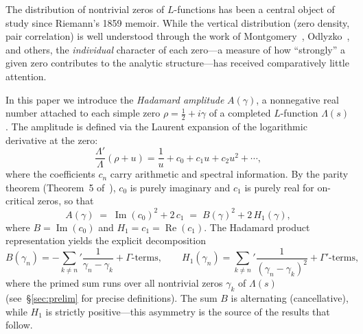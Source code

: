 \documentclass[11pt,a4paper]{article}
\theoremstyle{plain}
\theoremstyle{definition}
\newcommand{\La}{\Lambda}
\begin{document}
The distribution of nontrivial zeros of $L$-functions has been a central
object of study since Riemann's 1859 memoir.  While the vertical
distribution (zero density, pair correlation) is well understood
through the work of Montgomery~\cite{montgomery1973},
Odlyzko~\cite{odlyzko1987}, and others, the \emph{individual} character
of each zero---a measure of how ``strongly'' a given zero contributes
to the analytic structure---has received comparatively little attention.

In this paper we introduce the \emph{Hadamard amplitude}
$A(\gamma)$, a nonnegative real number attached to each simple zero
$\rho = \tfrac{1}{2} + i\gamma$ of a completed $L$-function
$\La(s)$.  The amplitude is defined via the Laurent expansion of
the logarithmic derivative at the zero:
\begin{equation}\label{eq:laurent}
  \frac{\La'}{\La}(\rho + u) = \frac{1}{u} + c_0 + c_1 u
  + c_2 u^2 + \cdots,
\end{equation}
where the coefficients $c_n$ carry arithmetic and spectral information.
By the parity theorem (Theorem~5 of~\cite{paper2}), $c_0$ is purely
imaginary and $c_1$ is purely real for on-critical zeros, so that
\begin{equation}\label{eq:amplitude_def}
  A(\gamma) \;=\; \operatorname{Im}(c_0)^2 + 2\,c_1
  \;=\; B(\gamma)^2 + 2\,H_1(\gamma),
\end{equation}
where $B = \operatorname{Im}(c_0)$ and $H_1 = c_1 = \operatorname{Re}(c_1)$.
The Hadamard product representation yields the explicit decomposition
\begin{equation}\label{eq:hadamard_decomp}
  B(\gamma_n) = -\sum_{k \ne n}' \frac{1}{\gamma_n - \gamma_k}
  + \Gamma\text{-terms}, \qquad
  H_1(\gamma_n) = \sum_{k \ne n}' \frac{1}{(\gamma_n - \gamma_k)^2}
  + \Gamma'\text{-terms},
\end{equation}
where the primed sum runs over all nontrivial zeros $\gamma_k$ of
$\La(s)$ (see~\S\ref{sec:prelim} for precise definitions).
The sum $B$ is alternating (cancellative), while $H_1$ is strictly
positive---this asymmetry is the source of the results that follow.
\end{document}
